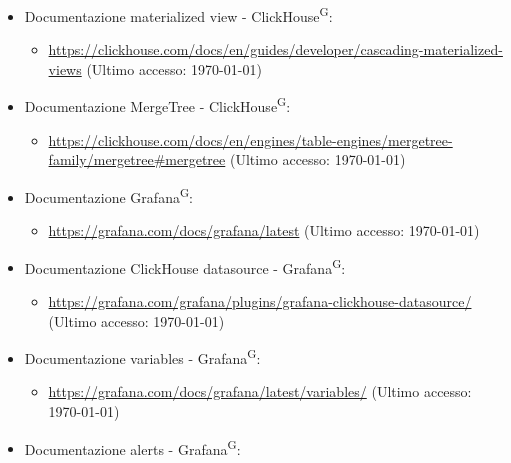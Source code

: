 \documentclass[8pt]{article}
\newcommand{\glossterm}[1]{#1\textsuperscript{G}} %
\begin{document}
\begin{itemize}
    \begin{itemize}
		\item \href{https://clickhouse.com/docs/en/engines/table-engines/integrations/kafka}{\color{myblue}https://clickhouse.com/docs/en/engines/table-engines/integrations/kafka} (Ultimo accesso: \today)
	\end{itemize}
    \item Documentazione materialized view - \glossterm{ClickHouse}:
    \begin{itemize}
		\item \href{https://clickhouse.com/docs/en/guides/developer/cascading-materialized-views}{\color{myblue}https://clickhouse.com/docs/en/guides/developer/cascading-materialized-views} (Ultimo accesso: \today)
	\end{itemize}
    \item Documentazione MergeTree - \glossterm{ClickHouse}:
    \begin{itemize}
		\item \href{https://clickhouse.com/docs/en/engines/table-engines/mergetree-family/mergetree#mergetree}{\color{myblue}https://clickhouse.com/docs/en/engines/table-engines/mergetree-family/mergetree\#mergetree} (Ultimo accesso: \today)
	\end{itemize}
    \item Documentazione \glossterm{Grafana}:
    \begin{itemize}
		\item \href{https://grafana.com/docs/grafana/latest}{\color{myblue}https://grafana.com/docs/grafana/latest} (Ultimo accesso: \today)
	\end{itemize}
    \item Documentazione ClickHouse datasource - \glossterm{Grafana}:
    \begin{itemize}
		\item \href{https://grafana.com/grafana/plugins/grafana-clickhouse-datasource/}{\color{myblue}https://grafana.com/grafana/plugins/grafana-clickhouse-datasource/} (Ultimo accesso: \today)
	\end{itemize}
    \item Documentazione variables - \glossterm{Grafana}:
    \begin{itemize}
		\item \href{https://grafana.com/docs/grafana/latest/variables/}{\color{myblue}https://grafana.com/docs/grafana/latest/variables/} (Ultimo accesso: \today)
	\end{itemize}
    \item Documentazione alerts - \glossterm{Grafana}:

\end{itemize}
\end{document}
